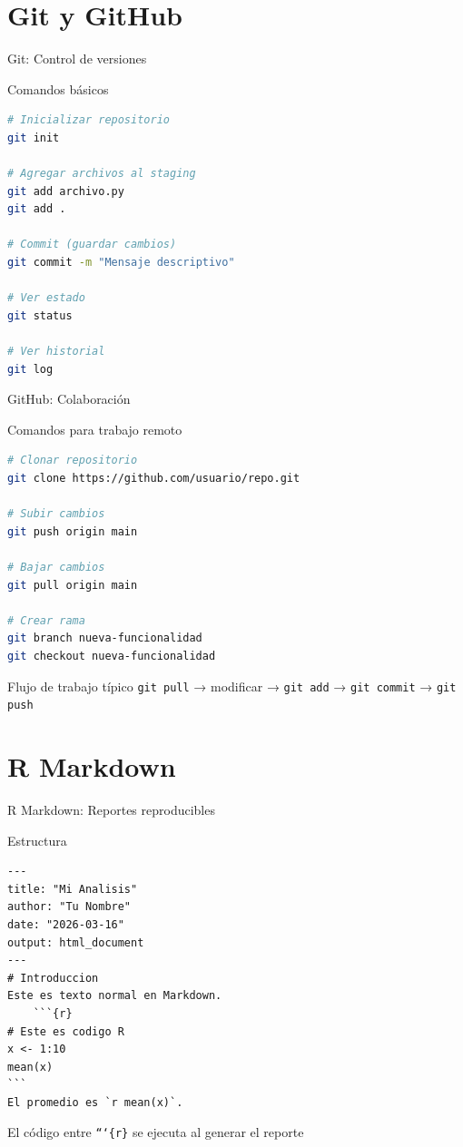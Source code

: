 \documentclass[aspectratio=169]{beamer}
\begin{document}
\section{Git y GitHub}

\begin{frame}[fragile]{Git: Control de versiones}
\begin{block}{Comandos básicos}
\begin{lstlisting}[language=bash]
# Inicializar repositorio
git init

# Agregar archivos al staging
git add archivo.py
git add .

# Commit (guardar cambios)
git commit -m "Mensaje descriptivo"

# Ver estado
git status

# Ver historial
git log
\end{lstlisting}
\end{block}
\end{frame}

\begin{frame}[fragile]{GitHub: Colaboración}
\begin{block}{Comandos para trabajo remoto}
\begin{lstlisting}[language=bash]
# Clonar repositorio
git clone https://github.com/usuario/repo.git

# Subir cambios
git push origin main

# Bajar cambios
git pull origin main

# Crear rama
git branch nueva-funcionalidad
git checkout nueva-funcionalidad
\end{lstlisting}
\end{block}

\begin{exampleblock}{Flujo de trabajo típico}
\texttt{git pull} → modificar → \texttt{git add} → \texttt{git commit} → \texttt{git push}
\end{exampleblock}
\end{frame}

\section{R Markdown}

\begin{frame}[fragile]{R Markdown: Reportes reproducibles}
\small
\begin{block}{Estructura}
\begin{lstlisting}
---
title: "Mi Analisis"
author: "Tu Nombre"
date: "2026-03-16"
output: html_document
---
# Introduccion
Este es texto normal en Markdown.
    ```{r}
# Este es codigo R
x <- 1:10
mean(x)
```
El promedio es `r mean(x)`.
\end{lstlisting}
\end{block}

\small
El código entre \texttt{```\{r\}} se ejecuta al generar el reporte
\end{frame}
\end{document}
